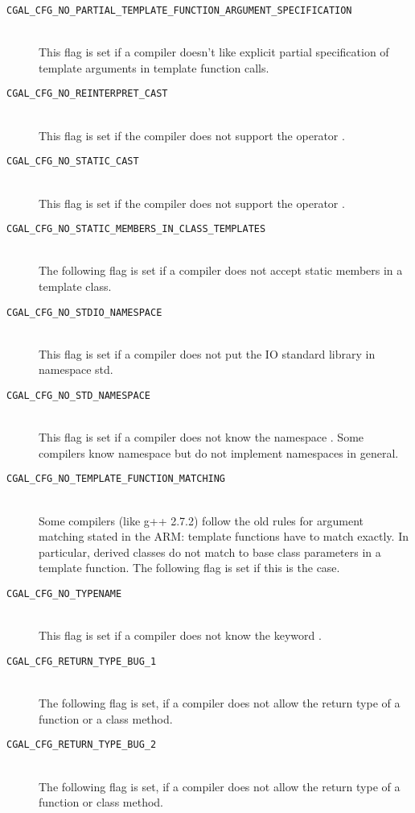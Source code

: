 \begin{description}
\item[{\tt CGAL\_CFG\_NO\_PARTIAL\_TEMPLATE\_FUNCTION\_ARGUMENT\_SPECIFICATION}]~\\
 This flag is set if a compiler doesn't like explicit partial 
 specification of template arguments in template function calls.

\item[{\tt CGAL\_CFG\_NO\_REINTERPRET\_CAST}]~\\
  This flag is set if the compiler does not support the operator
  .

\item[{\tt CGAL\_CFG\_NO\_STATIC\_CAST}]~\\
  This flag is set if the compiler does not support the operator
  .

\item[{\tt CGAL\_CFG\_NO\_STATIC\_MEMBERS\_IN\_CLASS\_TEMPLATES}]~\\
  The following flag is set if a compiler does not accept static
  members in a template class.
 
\item[{\tt CGAL\_CFG\_NO\_STDIO\_NAMESPACE}]~\\ 
  This flag is
  set if a compiler does not put the IO standard library in namespace
  {\ccFont std}.
 
\item[{\tt CGAL\_CFG\_NO\_STD\_NAMESPACE}]~\\ 
  This flag is
  set if a compiler does not know the namespace .  Some
  compilers know namespace  but do not implement namespaces in
  general.

\item[{\tt CGAL\_CFG\_NO\_TEMPLATE\_FUNCTION\_MATCHING}]~\\
  Some compilers (like g++ 2.7.2) follow the old rules for argument
  matching stated in the ARM: template functions have to match
  exactly. In particular, derived classes do not match to base class
  parameters in a template function. The following flag is set if this
  is the case.

\item[{\tt CGAL\_CFG\_NO\_TYPENAME}]~\\
  This flag is set if a compiler does not know the keyword
  .

\item[{\tt CGAL\_CFG\_RETURN\_TYPE\_BUG\_1}]~\\
  The following flag is set, if a compiler does not allow the return
  type  of a function or a class method.

\item[{\tt CGAL\_CFG\_RETURN\_TYPE\_BUG\_2}]~\\
  The following flag is set, if a compiler does not allow the return
  type  of a function or class method.
\end{description}


